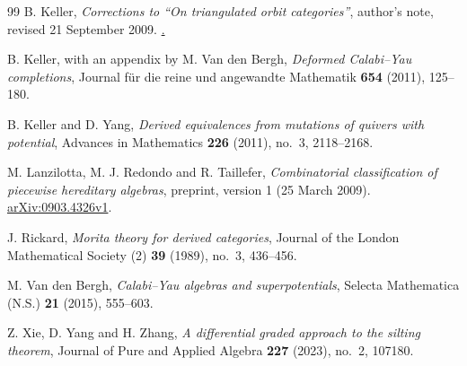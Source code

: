 \documentclass[12pt,a4paper,english,reqno]{amsart}
\theoremstyle{plain}
\theoremstyle{definition}
\numberwithin{equation}{section}
\begin{document}
\begin{thebibliography}{99}
B. Keller, \emph{Corrections to ``On triangulated orbit categories''}, author's note, revised 21 September 2009. \href{https://webusers.imj-prg.fr/~bernhard.keller/publ/corrTriaOrbit.pdf}. 

B. Keller, with an appendix by M. Van den Bergh, \emph{Deformed Calabi--Yau completions}, Journal f\"ur die reine und angewandte Mathematik \textbf{654} (2011), 125--180. 

B. Keller and D. Yang, \emph{Derived equivalences from mutations of quivers with potential}, Advances in Mathematics \textbf{226} (2011), no.~3, 2118--2168.

M. Lanzilotta, M. J. Redondo and R. Taillefer, \emph{Combinatorial classification of piecewise hereditary algebras}, preprint, version 1 (25 March 2009). \href{https://arxiv.org/abs/0903.4326v1}{arXiv:0903.4326v1}. 

J. Rickard, \emph{Morita theory for derived categories}, Journal of the London Mathematical Society (2) \textbf{39} (1989), no.~3, 436--456. 

M. Van den Bergh, \emph{Calabi--Yau algebras and superpotentials}, Selecta Mathematica (N.S.) \textbf{21} (2015), 555--603. 

Z. Xie, D. Yang and H. Zhang, \emph{A differential graded approach to the silting theorem}, Journal of Pure and Applied Algebra \textbf{227} (2023), no.~2, 107180. 

\end{thebibliography}
\end{document}
